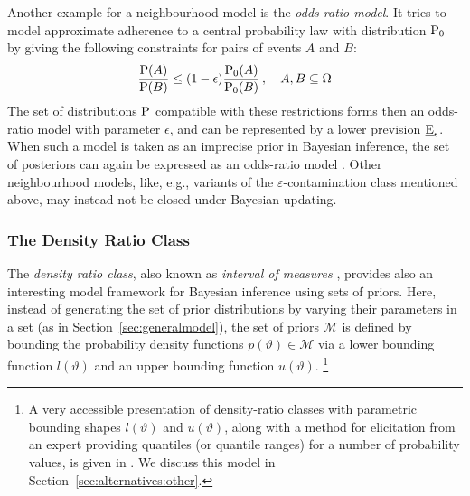 Another example for a neighbourhood model is the \emph{odds-ratio model}.
It tries to model approximate adherence to a central probability law with distribution $\operatorname{P}_0$
by giving the following constraints for pairs of events $A$ and $B$:
\begin{align*}
\frac{\operatorname{P}(A)}{\operatorname{P}(B)} \le (1-\epsilon)\frac{\operatorname{P}_0(A)}{\operatorname{P}_0(B)}\,,\quad A, B \subseteq \Omega
\end{align*}
The set of distributions $\operatorname{P}$ compatible with these restrictions
forms then an odds-ratio model with parameter $\epsilon$,
and can be represented by a lower prevision $\underline{\operatorname{E}}_\epsilon$.
When such a model is taken as an imprecise prior in Bayesian inference,
the set of posteriors can again be expressed as an odds-ratio model
\parencite[\S 7.2]{itip-special}.
Other neighbourhood models, like, e.g.,
variants of the $\varepsilon$-contamination class mentioned above,
may instead not be closed under Bayesian updating.


\subsubsection{The Density Ratio Class}
\label{sec:alternatives:drc}

The \emph{density ratio class}, also known as \emph{interval of measures}
\parencites{1981:derobertis}{1990:berger},
provides also an interesting model framework for Bayesian inference using sets of priors.
Here, instead of generating the set of prior distributions by varying their parameters in a set
(as in Section~\ref{sec:generalmodel}),
the set of priors $\mathcal{M}$ is defined by bounding the probability density functions
$p(\vartheta) \in \mathcal{M}$
via a lower bounding function $l(\vartheta)$ and an upper bounding function $u(\vartheta)$.%
\footnote{\label{foot:rinderknecht}A very accessible presentation of density-ratio classes with
parametric bounding shapes $l(\vartheta)$ and $u(\vartheta)$,
along with a method for elicitation from an expert
providing quantiles (or quantile ranges) for a number of probability values,
is given in \textcite{2011:rinderknecht}.
We discuss this model in Section~\ref{sec:alternatives:other}.}

